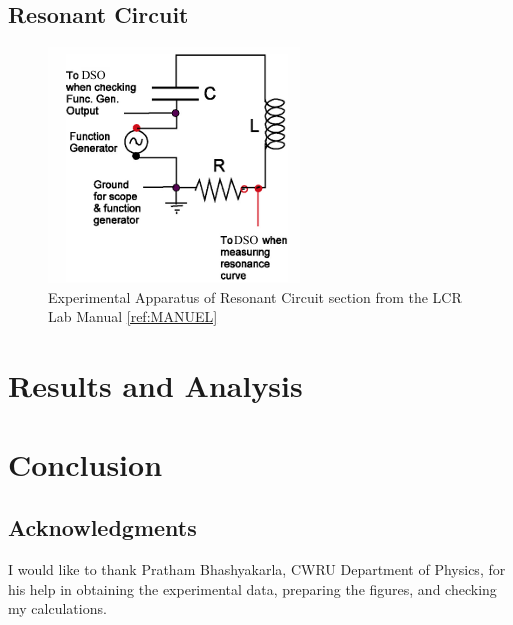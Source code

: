 \documentclass[12pt]{article}
\begin{document}
\lipsum[1]

\subsection{Resonant Circuit}
\lipsum[1]

\begin{figure}
    \centering
    \includegraphics[width=\linewidth]{figures/images/LCR_Apparatus_2.png}
    \caption{Experimental Apparatus of Resonant Circuit section from the LCR Lab Manual \ref{ref:MANUEL}}
    \label{fig:LCR_Apparatus_2}
\end{figure}

\lipsum[1]

\section{Results and Analysis}
\lipsum[1]

\section{Conclusion}
\lipsum[1]

\subsection{Acknowledgments}
I would like to thank Pratham Bhashyakarla, CWRU Department of Physics, for his help in obtaining the experimental data, preparing the figures, and checking my calculations.
\end{document}
